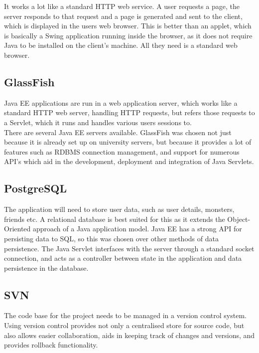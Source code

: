 \documentclass[a4paper]{article}
\begin{document}
It works a lot like a standard HTTP web service. A user requests a page, the server responds to that request and a page is generated and sent to the client, which is displayed in the users web browser. This is better than an applet, which is basically a Swing application running inside the browser, as it does not require Java to be installed on the client's machine. All they need is a standard web browser.

\subsection{GlassFish}

Java EE applications are run in a web application server, which works like a standard HTTP web server, handling HTTP requests, but refers those requests to a Servlet, which it runs and handles various users sessions to.\\

There are several Java EE servers available. GlassFish was chosen not just because it is already set up on university servers, but because it provides a lot of features such as RDBMS connection management, and support for numerous API's which aid in the development, deployment and integration of Java Servlets.

\subsection{PostgreSQL}

The application will need to store user data, such as user details, monsters, friends etc.
A relational database is best suited for this as it extends the Object-Oriented approach of a Java application model.
Java EE has a strong API for persisting data to SQL, so this was chosen over other methods of data persistence.
The Java Servlet interfaces with the server through a standard socket connection, and acts as a controller between state in the application and data persistence in the database.

\subsection{SVN}

The code base for the project needs to be managed in a version control system. Using version control provides not only a centralised store for source code, but also allows easier collaboration, aids in keeping track of changes and versions, and provides rollback functionality.\\
\end{document}
